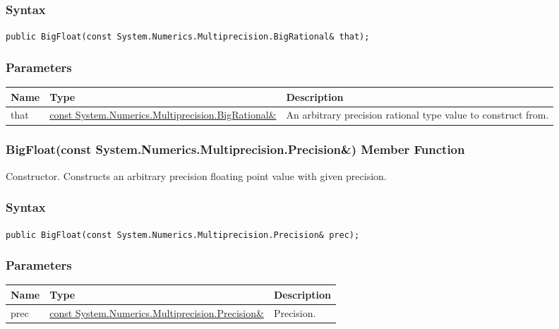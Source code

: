 \documentclass[a4paper,oneside,11.000000pt]{book}
\begin{document}
\subsubsection*{Syntax}
\texttt{public BigFloat(const System.Numerics.Multiprecision.BigRational\& that);}
\subsubsection*{Parameters}
\begin{flushleft}
\begin{supertabular}[l]{!{\raggedright}p{1.30721cm}!{\raggedright}p{8.55945cm}!{\raggedright}p{4.93333cm}}
\textbf{Name}
& \textbf{Type}
& \textbf{Description}
\\
\hline
that
& \hyperlink{System.Numerics.Multiprecision.BigRational}{const System.\-Numerics.\-Multiprecision.\-BigRational\&\-}
& An arbitrary precision rational type value to construct from.

\\
\end{supertabular}

\end{flushleft}
\clearpage

\hypertarget{System.Numerics.Multiprecision.BigFloat.constructor.P.System.Numerics.Multiprecision.BigFloat.C.R.System.Numerics.Multiprecision.Precision}{\subsubsection*{BigFloat(const System.Numerics.Multiprecision.Precision\&) Member Function}}
\begin{flushleft}
Constructor. Constructs an arbitrary precision floating point value with given precision.

\end{flushleft}
\subsubsection*{Syntax}
\texttt{public BigFloat(const System.Numerics.Multiprecision.Precision\& prec);}
\subsubsection*{Parameters}
\begin{flushleft}
\begin{supertabular}[l]{!{\raggedright}p{1.30721cm}!{\raggedright}p{8.55945cm}!{\raggedright}p{2.65538cm}}
\textbf{Name}
& \textbf{Type}
& \textbf{Description}
\\
\hline
prec
& \hyperlink{System.Numerics.Multiprecision.Precision}{const System.\-Numerics.\-Multiprecision.\-Precision\&\-}
& Precision.

\\
\end{supertabular}

\end{flushleft}
\clearpage
\end{document}
